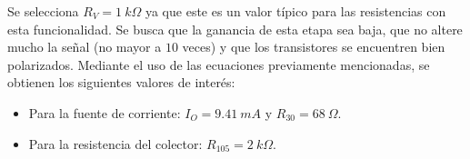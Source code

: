 Se selecciona $R_V = 1 \ k\Omega$ ya que este es un valor típico para las resistencias con esta funcionalidad. Se busca que la ganancia de esta etapa sea baja, que no altere mucho la señal (no mayor a $10$ veces) y que los transistores se encuentren bien polarizados. Mediante el uso de las ecuaciones previamente mencionadas, se obtienen los siguientes valores de interés:
\begin{itemize}
	\item Para la fuente de corriente: $I_O = 9.41 \ mA$ y $R_{30} = 68 \ \Omega$.
	\item Para la resistencia del colector: $R_{105} = 2 \ k\Omega$.
\end{itemize}